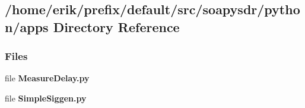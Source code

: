 \subsection{/home/erik/prefix/default/src/soapysdr/python/apps Directory Reference}
\label{dir_f07f4ebd9256e2bb621fa5ab940d66ce}
\subsubsection*{Files}
\begin{DoxyCompactItemize}
\item 
file {\bf Measure\+Delay.\+py}
\item 
file {\bf Simple\+Siggen.\+py}
\end{DoxyCompactItemize}
